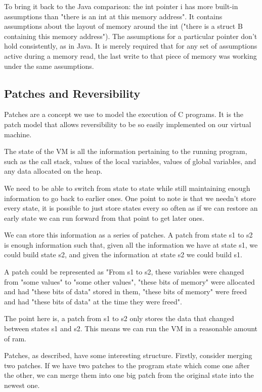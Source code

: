\documentclass[10pt,a4paper]{report}
\begin{document}
To bring it back to the Java comparison: the int pointer i has more built-in assumptions than "there is an int at this memory address". It contains assumptions about the layout of memory around the int ("there is a struct B containing this memory address"). The assumptions for a particular pointer don't hold consistently, as in Java. It is merely required that for any set of assumptions active during a memory read, the last write to that piece of memory was working under the same assumptions.

\subsection{Patches and Reversibility}
Patches are a concept we use to model the execution of C programs. It is the patch model that allows reversibility to be so easily implemented on our virtual machine.

The state of the VM is all the information pertaining to the running program, such as the call stack, values of the local variables, values of global variables, and any data allocated on the heap.

We need to be able to switch from state to state while still maintaining enough information to go back to earlier ones. One point to note is that we needn't store every state, it is possible to just store states every so often as if we can restore an early state we can run forward from that point to get later ones.

We can store this information as a series of patches. A patch from state s1 to s2 is enough information such that, given all the information we have at state s1, we could build state s2, and given the information at state s2 we could build s1.

A patch could be represented as "From s1 to s2, these variables were changed from "some values" to "some other values", "these bits of memory" were allocated and had "these bits of data" stored in them, "these bits of memory" were freed and had "these bits of data" at the time they were freed".

The point here is, a patch from s1 to s2 only stores the data that changed between states s1 and s2. This means we can run the VM in a reasonable amount of ram.

Patches, as described, have some interesting structure. Firstly, consider merging two patches. If we have two patches to the program state which come one after the other, we can merge them into one big patch from the original state into the newest one.
\end{document}

